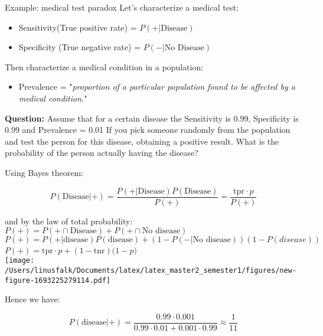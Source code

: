 \begin{example}{Example: medical test paradox}
    Let's characterize a medical test:
    \begin{itemize}
        \item Sensitivity(True positive rate) = $P(+ | \text{Disease})$
        \item Specificity (True negative rate) = $P(- | \text{No Disease})$
    \end{itemize}
    Then characterize a medical condition in a population:
    \begin{itemize}
        \item Prevalence = "\emph{proportion of a particular population found to be affected by a medical condition.}"
    \end{itemize} 
    \vspace{1em}
    \textbf{Question:} Assume that for a certain disease the Sensitivity is 0.99, Specificity is 0.99 and Prevalence = 0.01
    If you pick someone randomly from the population and test the person for this disease, obtaining a positive
    result. What is the probability of the person actually having the disease?
    \vspace{2em}
    
    Using Bayes theorem:

    \begin{equation}
        P(\text{Disease}|+) = \frac{P(+|\text{Disease})P(\text{Disease})} {P(+)} = \frac{\text{tpr} \cdot p} {P(+)}  
    \end{equation}

    and by the law of total probability: \\
    $P(+) = P(+ \cap \text{Disease}) + P(+ \cap \text{No disease})$ \\
    $P(+) = P(+|\text{disease})P(\text{disease}) + (1-P(-|\text{No disease}))(1-P(disease))$ \\
    $P(+) = \text{tpr} \cdot p + (1 - \text{tnr})\dot (1-p)$ \\
    
    \vspace{2em}
    \texttt{[image: /Users/linusfalk/Documents/latex/latex\_master2\_semester1/figures/new-figure-1693225279114.pdf]}

    Hence we have:

    \begin{equation}
        P(\text{disease}|+) = \frac{0.99 \cdot 0.001} {0.99 \cdot 0.01 + 0.001 \cdot 0.99} \approx \frac{1} {11} 
    \end{equation}
\end{example}

